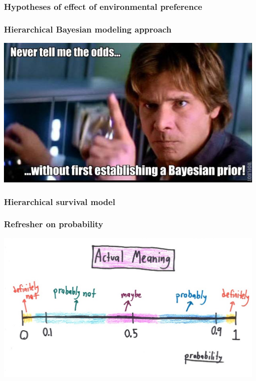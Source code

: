 \documentclass{beamer}
\begin{document}
\begin{frame}
  \frametitle{Hypotheses of effect of environmental preference}
\end{frame}


\begin{frame}
  \frametitle{Hierarchical Bayesian modeling approach}

  \includegraphics[width = \textwidth,height = 0.8\textheight,keepaspectratio = true]{figure/han_bayes}

  \tiny{}
\end{frame}


\begin{frame}
  \frametitle{Hierarchical survival model}
\end{frame}


\begin{frame}
  \frametitle{Refresher on probability}

  \includegraphics[width = \textwidth,height = 0.8\textheight,keepaspectratio = true]{figure/probability}

  \tiny{}
\end{frame}
\end{document}
